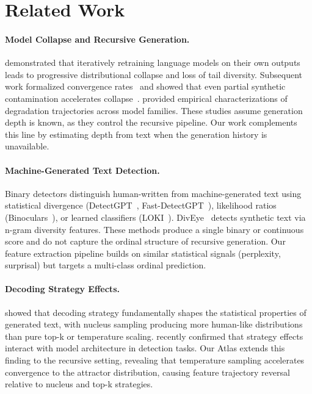 \documentclass[11pt,a4paper]{article}
\begin{document}
\section{Related Work}

\paragraph{Model Collapse and Recursive Generation.}
\citet{shumailov2024ai} demonstrated that iteratively retraining language models on their own outputs leads to progressive distributional collapse and loss of tail diversity. Subsequent work formalized convergence rates~\citep{dohmatob2024tale,gerstgrasser2024model} and showed that even partial synthetic contamination accelerates collapse~\citep{alemohammad2024selfconsuming}. \citet{drayson2025investigating} provided empirical characterizations of degradation trajectories across model families. These studies assume generation depth is known, as they control the recursive pipeline. Our work complements this line by estimating depth from text when the generation history is unavailable.

\paragraph{Machine-Generated Text Detection.}
Binary detectors distinguish human-written from machine-generated text using statistical divergence (DetectGPT~\citep{mitchell2023detectgpt}, Fast-DetectGPT~\citep{bao2024fastdetectgpt}), likelihood ratios (Binoculars~\citep{hans2024binoculars}), or learned classifiers (LOKI~\citep{li2024loki}). DivEye~\citep{liang2024diveye} detects synthetic text via n-gram diversity features. These methods produce a single binary or continuous score and do not capture the ordinal structure of recursive generation. Our feature extraction pipeline builds on similar statistical signals (perplexity, surprisal) but targets a multi-class ordinal prediction.

\paragraph{Decoding Strategy Effects.}
\citet{holtzman2020curious} showed that decoding strategy fundamentally shapes the statistical properties of generated text, with nucleus sampling producing more human-like distributions than pure top-k or temperature scaling. \citet{garcesarias2025decoding} recently confirmed that strategy effects interact with model architecture in detection tasks. Our Atlas extends this finding to the recursive setting, revealing that temperature sampling accelerates convergence to the attractor distribution, causing feature trajectory reversal relative to nucleus and top-k strategies.
\end{document}
